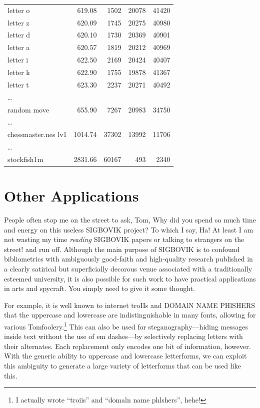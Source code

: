 \documentclass[twocolumn]{article}
\begin{document}
{\begin{center}
\begin{supertabular}{lrrrr}
letter o & 619.08 & 1502 & 20078 & 41420 \\
letter z & 620.09 & 1745 & 20275 & 40980 \\
letter d & 620.10 & 1730 & 20369 & 40901 \\
letter a & 620.57 & 1819 & 20212 & 40969 \\
letter i & 622.50 & 2169 & 20424 & 40407 \\
letter k & 622.90 & 1755 & 19878 & 41367 \\
letter t & 623.30 & 2237 & 20271 & 40492 \\
\ldots \\
random move & 655.90 & 7267 & 20983 & 34750 \\
\ldots \\
chessmaster.nes lv1 & 1014.74 & 37302 & 13992 & 11706 \\
\ldots \\
stockfish1m & 2831.66 & 60167 & 493 & 2340 \\
\end{supertabular}
\end{center}
}



\section{Other Applications}

People often stop me on the street to ask, Tom, Why did you spend so
much time and energy on this useless SIGBOVIK project? To which I say,
Ha! At least I am not wasting my time {\it reading} SIGBOVIK papers or
talking to strangers on the street! and run off. Although the main
purpose of SIGBOVIK is to confound bibliometrics with ambiguously
good-faith and high-quality research published in a clearly satirical
but superficially decorous venue associated with a traditionally
esteemed university, it is also possible for such work to have
practical applications in arts and spycraft. You simply need to give
it some thought.

For example, it is well known to {\sf internet troIIs} and {\sf DOMAlN
  NAME PHlSHERS} that the uppercase  and lowercase
 are indistinguishable in many fonts, allowing for
various Tomfoolery.\footnote{I actually wrote ``troiis'' and ``domaln
  name phlshers'', hehe!} This can also be used for
steganography---hiding messages inside text without the use of em
dashes---by selectively replacing letters with their alternates. Each
replacement only encodes one bit of information, however. With the
generic ability to uppercase and lowercase letterforms, we can exploit
this ambiguity to generate a large variety of letterforms that can be
used like this.
\end{document}
